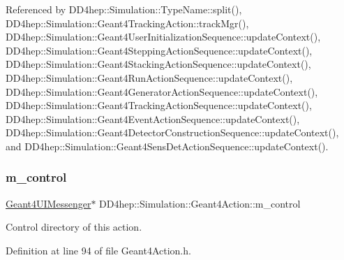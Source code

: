 Referenced by D\+D4hep\+::\+Simulation\+::\+Type\+Name\+::split(), D\+D4hep\+::\+Simulation\+::\+Geant4\+Tracking\+Action\+::track\+Mgr(), D\+D4hep\+::\+Simulation\+::\+Geant4\+User\+Initialization\+Sequence\+::update\+Context(), D\+D4hep\+::\+Simulation\+::\+Geant4\+Stepping\+Action\+Sequence\+::update\+Context(), D\+D4hep\+::\+Simulation\+::\+Geant4\+Stacking\+Action\+Sequence\+::update\+Context(), D\+D4hep\+::\+Simulation\+::\+Geant4\+Run\+Action\+Sequence\+::update\+Context(), D\+D4hep\+::\+Simulation\+::\+Geant4\+Generator\+Action\+Sequence\+::update\+Context(), D\+D4hep\+::\+Simulation\+::\+Geant4\+Tracking\+Action\+Sequence\+::update\+Context(), D\+D4hep\+::\+Simulation\+::\+Geant4\+Event\+Action\+Sequence\+::update\+Context(), D\+D4hep\+::\+Simulation\+::\+Geant4\+Detector\+Construction\+Sequence\+::update\+Context(), and D\+D4hep\+::\+Simulation\+::\+Geant4\+Sens\+Det\+Action\+Sequence\+::update\+Context().

\hypertarget{class_d_d4hep_1_1_simulation_1_1_geant4_action_aff23910feb64988b85e08b1faff251f4}{}\label{class_d_d4hep_1_1_simulation_1_1_geant4_action_aff23910feb64988b85e08b1faff251f4} 
\subsubsection{\texorpdfstring{m\+\_\+control}{m\_control}}
{\footnotesize\ttfamily \hyperlink{class_d_d4hep_1_1_simulation_1_1_geant4_u_i_messenger}{Geant4\+U\+I\+Messenger}$\ast$ D\+D4hep\+::\+Simulation\+::\+Geant4\+Action\+::m\+\_\+control\hspace{0.3cm}{\ttfamily [protected]}}



Control directory of this action. 



Definition at line 94 of file Geant4\+Action.\+h.

\hypertarget{class_d_d4hep_1_1_simulation_1_1_geant4_action_adb04332ff4e52bce5b9ae1a5848b5d5e}{}\label{class_d_d4hep_1_1_simulation_1_1_geant4_action_adb04332ff4e52bce5b9ae1a5848b5d5e} 
